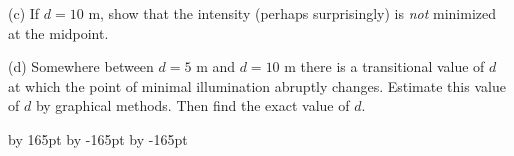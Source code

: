 \documentclass{sebase}
\begin{document}
\begin{multicols}{2}
\begin{ExerciseList}
\begin{ExerciseList}
\item[(c)] If $d=10$ m, show that the intensity (perhaps surprisingly) is 
\textit{not} minimized at the midpoint.

%

\item[(d)] Somewhere between $d=5$ m and $d=10$ m there is a transitional
value of $d$ at which the point of minimal illumination abruptly changes.
Estimate this value of $d$ by graphical methods. Then find the exact value
of $d$.

%
\vspace*{6pt}
\end{ExerciseList}

\hspace*{\fill}\hspace*{\fill}
\end{ExerciseList}

\end{multicols}
\advance \leftskip by 165pt
\advance\hsize by -165pt
\advance\linewidth by -165pt
%
\end{document}
